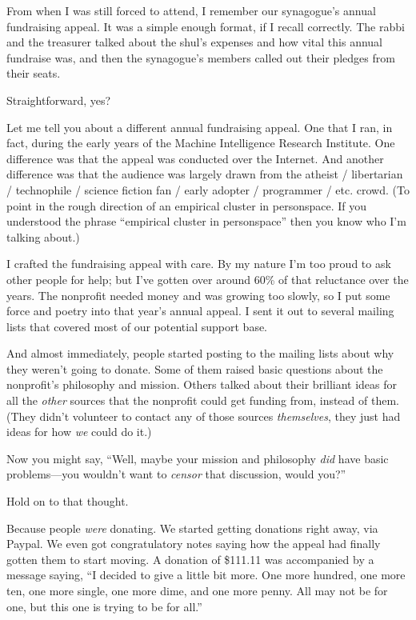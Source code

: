 
{
 From when I was still forced to attend, I remember our
synagogue's annual fundraising appeal. It was a simple
enough format, if I recall correctly. The rabbi and the treasurer
talked about the shul's expenses and how vital this
annual fundraise was, and then the synagogue's members
called out their pledges from their seats. }

{
 Straightforward, yes?}

{
 Let me tell you about a different annual fundraising appeal. One
that I ran, in fact, during the early years of the Machine Intelligence
Research Institute. One difference was that the appeal was conducted
over the Internet. And another difference was that the audience was
largely drawn from the atheist / libertarian / technophile / science
fiction fan / early adopter / programmer / etc. crowd. (To point in the
rough direction of an empirical cluster in personspace. If you
understood the phrase ``empirical cluster in
personspace'' then you know who I'm
talking about.)}

{
 I crafted the fundraising appeal with care. By my nature
I'm too proud to ask other people for help; but
I've gotten over around 60\% of that reluctance over
the years. The nonprofit needed money and was growing too slowly, so I
put some force and poetry into that year's annual
appeal. I sent it out to several mailing lists that covered most of our
potential support base.}

{
 And almost immediately, people started posting to the mailing
lists about why they weren't going to donate. Some of
them raised basic questions about the nonprofit's
philosophy and mission. Others talked about their brilliant ideas for
all the \textit{other} sources that the nonprofit could get funding
from, instead of them. (They didn't volunteer to
contact any of those sources \textit{themselves}, they just had ideas
for how \textit{we} could do it.)}

{
 Now you might say, ``Well, maybe your mission and
philosophy \textit{did} have basic problems---you
wouldn't want to \textit{censor} that discussion, would
you?''}

{
 Hold on to that thought.}

{
 Because people \textit{were} donating. We started getting
donations right away, via Paypal. We even got congratulatory notes
saying how the appeal had finally gotten them to start moving. A
donation of \$111.11 was accompanied by a message saying,
``I decided to give a little bit more. One more
hundred, one more ten, one more single, one more dime, and one more
penny. All may not be for one, but this one is trying to be for
all.''}

